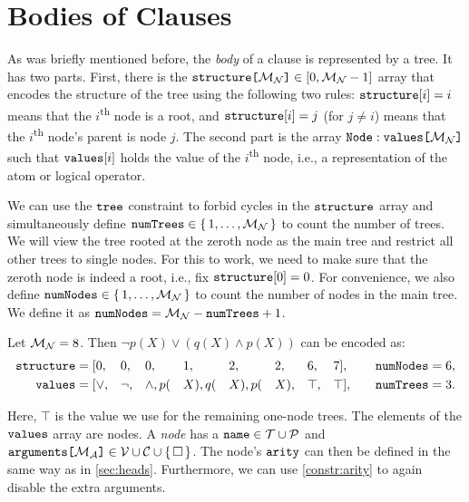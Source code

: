 \section{Bodies of Clauses}\label{sec:bodies}

As was briefly mentioned before, the \emph{body} of a clause is represented by a
tree. It has two parts. First, there is the
$\arrayd{structure}{\maxNumNodes{}}{[0, \maxNumNodes{} - 1]}$ array that encodes
the structure of the tree using the following two rules:
$\variable{structure}[i] = i$ means that the $i$\textsuperscript{th} node is a
root, and $\variable{structure}[i] = j$ (for $j \ne i$) means that the
$i$\textsuperscript{th} node's parent is node $j$. The second part is the array
$\arrayt{values}{\maxNumNodes{}}{Node}$ such that $\variable{values}[i]$ holds
the value of the $i$\textsuperscript{th} node, i.e., a representation of the
atom or logical operator.

We can use the $\variable{tree}$ constraint \citep{DBLP:conf/cp/FagesL11} to
forbid cycles in the $\variable{structure}$ array and simultaneously define
$\variable{numTrees} \in \{\, 1, \dots, \maxNumNodes{} \,\}$ to count the number
of trees. We will view the tree rooted at the zeroth node as the main tree and
restrict all other trees to single nodes. For this to work, we need to make sure
that the zeroth node is indeed a root, i.e., fix $\variable{structure}[0] = 0$.
For convenience, we also define
$\variable{numNodes} \in \{\, 1, \dots, \maxNumNodes{} \,\}$ to count the number
of nodes in the main tree. We define it as
$\variable{numNodes} = \maxNumNodes{} - \variable{numTrees} + 1$.

\begin{example}\label{example:formula}
  Let $\maxNumNodes{} = 8$. Then $\neg p(X) \lor (q(X) \land p(X))$ can
  be encoded as:
  \begin{alignat*}{9}
    \variable{structure} &= [0, &&0, &&0, &&1, &&2, &&2, &&6, &&7], \quad &&\variable{numNodes} = 6, \\
    \variable{values} &= [{\lor}, &&{\neg}, &&{\land}, p(&&X), q(&&X), p(&&X), &&\top, &&\top], \quad &&\variable{numTrees} = 3.
  \end{alignat*}
\end{example}

Here, $\top$ is the value we use for the remaining one-node trees. The elements
of the $\variable{values}$ array are nodes. A \emph{node} has a
$\variable{name} \in \tokens{} \cup \predicates{}$ and
$\arrayd{arguments}{\maxArity{}}{\variables{} \cup \constants{} \cup \{\, \Box \,\}}$.
The node's $\variable{arity}$ can then be defined in the same way as in
\cref{sec:heads}. Furthermore, we can use \cref{constr:arity} to again disable
the extra arguments.

